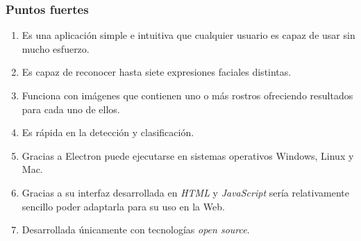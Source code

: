 \documentclass[a4paper,11pt]{book}
\begin{document}
\subsubsection{Puntos fuertes}
\begin{enumerate}
	\item Es una aplicación simple e intuitiva que cualquier usuario es capaz de usar sin mucho esfuerzo.
	\item Es capaz de reconocer hasta siete expresiones faciales distintas.
	\item Funciona con imágenes que contienen uno o más rostros ofreciendo resultados para cada uno de ellos.
	\item Es rápida en la detección y clasificación.
	\item Gracias a Electron\cite{electron} puede ejecutarse en sistemas operativos Windows, Linux y Mac.
	\item Gracias a su interfaz desarrollada en \textit{HTML} y \textit{JavaScript} sería relativamente sencillo poder adaptarla para su uso en la Web.
	\item Desarrollada únicamente con tecnologías \textit{open source}.
\end{enumerate}
\end{document}
